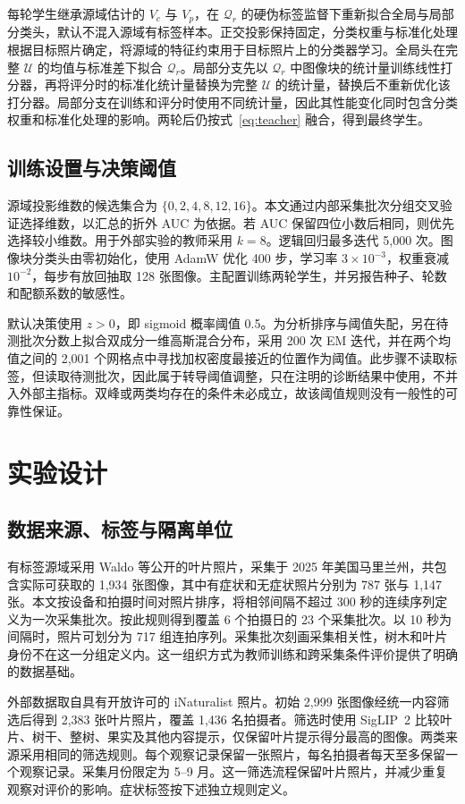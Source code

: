 \documentclass[11pt,a4paper,UTF8,fontset=windows,scheme=plain]{ctexart}
\begin{document}
每轮学生继承源域估计的 $V_c$ 与 $V_p$，在 $\mathcal Q_r$ 的硬伪标签监督下重新拟合全局与局部分类头，默认不混入源域有标签样本。正交投影保持固定，分类权重与标准化处理根据目标照片确定，将源域的特征约束用于目标照片上的分类器学习。全局头在完整 $\mathcal U$ 的均值与标准差下拟合 $\mathcal Q_r$。局部分支先以 $\mathcal Q_r$ 中图像块的统计量训练线性打分器，再将评分时的标准化统计量替换为完整 $\mathcal U$ 的统计量，替换后不重新优化该打分器。局部分支在训练和评分时使用不同统计量，因此其性能变化同时包含分类权重和标准化处理的影响。两轮后仍按式~\eqref{eq:teacher} 融合，得到最终学生。

\subsection{训练设置与决策阈值}
源域投影维数的候选集合为 $\{0,2,4,8,12,16\}$。本文通过内部采集批次分组交叉验证选择维数，以汇总的折外 AUC 为依据。若 AUC 保留四位小数后相同，则优先选择较小维数。用于外部实验的教师采用 $k=8$。逻辑回归最多迭代 5,000 次。图像块分类头由零初始化，使用 AdamW 优化 400 步，学习率 $3\times10^{-3}$，权重衰减 $10^{-2}$，每步有放回抽取 128 张图像。主配置训练两轮学生，并另报告种子、轮数和配额系数的敏感性。

默认决策使用 $z>0$，即 sigmoid 概率阈值 0.5。为分析排序与阈值失配，另在待测批次分数上拟合双成分一维高斯混合分布，采用 200 次 EM 迭代，并在两个均值之间的 2,001 个网格点中寻找加权密度最接近的位置作为阈值。此步骤不读取标签，但读取待测批次，因此属于转导阈值调整，只在注明的诊断结果中使用，不并入外部主指标。双峰或两类均存在的条件未必成立，故该阈值规则没有一般性的可靠性保证。

\section{实验设计}
\label{sec:design}
\subsection{数据来源、标签与隔离单位}
有标签源域采用 Waldo 等公开的叶片照片，采集于 2025 年美国马里兰州\cite{waldo2026}，共包含实际可获取的 1,934 张图像，其中有症状和无症状照片分别为 787 张与 1,147 张。本文按设备和拍摄时间对照片排序，将相邻间隔不超过 300 秒的连续序列定义为一次采集批次。按此规则得到覆盖 6 个拍摄日的 23 个采集批次。以 10 秒为间隔时，照片可划分为 717 组连拍序列。采集批次刻画采集相关性，树木和叶片身份不在这一分组定义内。这一组织方式为教师训练和跨采集条件评价提供了明确的数据基础。

外部数据取自具有开放许可的 iNaturalist 照片。初始 2,999 张图像经统一内容筛选后得到 2,383 张叶片照片，覆盖 1,436 名拍摄者。筛选时使用 SigLIP~2\cite{tschannen2025} 比较叶片、树干、整树、果实及其他内容提示，仅保留叶片提示得分最高的图像。两类来源采用相同的筛选规则。每个观察记录保留一张照片，每名拍摄者每天至多保留一个观察记录。采集月份限定为 5--9 月。这一筛选流程保留叶片照片，并减少重复观察对评价的影响。症状标签按下述独立规则定义。
\end{document}
